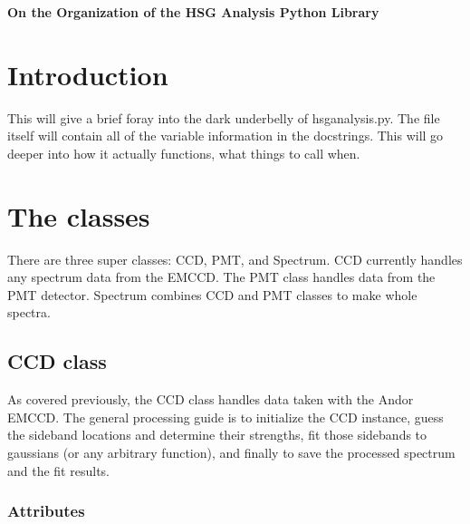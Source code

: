 \documentclass{article}
\begin{document}
	\begin{center}
		\begin{Large}
			\textbf{On the Organization of the HSG Analysis Python Library}\vspace{5pt}\\
		\end{Large}
	\end{center}

\section{Introduction}
\indent \indent This will give a brief foray into the dark underbelly of hsganalysis.py.  The file itself will contain all of the variable information in the docstrings.  This will go deeper into how it actually functions, what things to call when.
\section{The classes}
\indent \indent There are three super classes: CCD, PMT, and Spectrum.  CCD currently handles any spectrum data from the EMCCD.  The PMT class handles data from the PMT detector.  Spectrum combines CCD and PMT classes to make whole spectra.
\subsection{CCD class}
\indent \indent As covered previously, the CCD class handles data taken with the Andor EMCCD.  The general processing guide is to initialize the CCD instance, guess the sideband locations and determine their strengths, fit those sidebands to gaussians (or any arbitrary function), and finally to save the processed spectrum and the fit results.
\subsubsection{Attributes}
\end{document}
